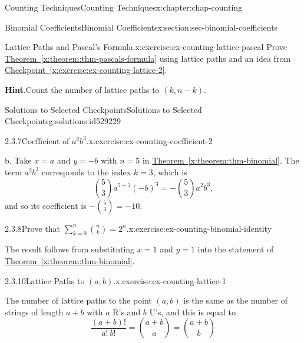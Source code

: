 \documentclass[oneside,10pt,]{book}
\newcommand{\blocktitlefont}{\relax}
\newcommand{\xreffont}{\relax}
\numberwithin{equation}{section}
\begin{document}
\begin{chapterptx}{Counting Techniques}{}{Counting Techniques}{}{}{x:chapter:chap-counting}
\begin{sectionptx}{Binomial Coefficients}{}{Binomial Coefficients}{}{}{x:section:sec-binomial-coefficients}
\begin{inlineexercise}{Lattice Paths and Pascal's Formula.}{x:exercise:ex-counting-lattice-pascal}
Prove \hyperref[x:theorem:thm-pascals-formula]{Theorem~{\xreffont\ref{x:theorem:thm-pascals-formula}}} using lattice paths and an idea from \hyperref[x:exercise:ex-counting-lattice-2]{Checkpoint~{\xreffont\ref{x:exercise:ex-counting-lattice-2}}}.%
\par\smallskip%
\noindent\textbf{\blocktitlefont Hint}.\hypertarget{g:hint:id529152}{}\quad{}Count the number of lattice paths to \((k,n-k)\).%
\end{inlineexercise}%
%
%
\typeout{************************************************}
\typeout{************************************************}
%
\begin{solutions-subsection-numberless}{Solutions to Selected Checkpoints}{}{Solutions to Selected Checkpoints}{}{}{g:solutions:id529229}
\begin{inlinesolution}{2.3.7}{Coefficient of \(a^2b^3\).}{x:exercise:ex-counting-coefficient-2}%
\par\smallskip%
\noindent\hypertarget{g:solution:id528944-main}{}b. Take \(x = a\) and \(y = -b\) with \(n = 5\) in \hyperref[x:theorem:thm-binomial]{Theorem~{\xreffont\ref{x:theorem:thm-binomial}}}. The term \(a^2b^3\) corresponds to the index \(k = 3\), which is%
\begin{equation*}
\binom{5}{3}a^{5-3}(-b)^3 = -\binom{5}{3}a^2b^3\text{,}
\end{equation*}
and so its coefficient is \(-\displaystyle\binom{5}{3} = -10\).%
\end{inlinesolution}%
\begin{inlinesolution}{2.3.8}{Prove that \(\displaystyle\sum_{k=0}^n \binom{n}{k} = 2^n\).}{x:exercise:ex-counting-binomial-identity}%
\par\smallskip%
\noindent\hypertarget{g:solution:id529015-main}{}The result follows from substituting \(x = 1\) and \(y = 1\) into the statement of \hyperref[x:theorem:thm-binomial]{Theorem~{\xreffont\ref{x:theorem:thm-binomial}}}.%
\end{inlinesolution}%
\begin{inlinesolution}{2.3.10}{Lattice Paths to \((a,b)\).}{x:exercise:ex-counting-lattice-1}%
\par\smallskip%
\noindent\hypertarget{g:solution:id529108-main}{}The number of lattice paths to the point \((a,b)\) is the same as the number of strings of length \(a+b\) with \(a\) R's and \(b\) U's, and this is equal to%
\begin{equation*}
\dfrac{(a+b)!}{a! \ b!} = \binom{a+b}{a} = \binom{a+b}{b}

\end{equation*}
\end{inlinesolution}
\end{solutions-subsection-numberless}
\end{sectionptx}
\end{chapterptx}
\end{document}
